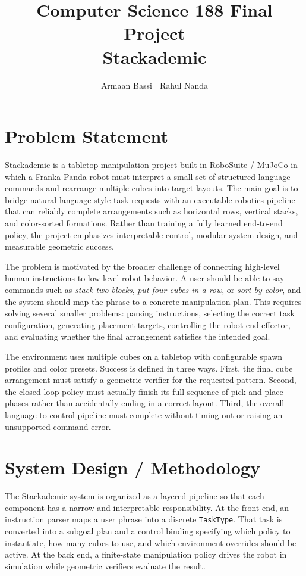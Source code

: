 \documentclass[10pt,letterpaper,twocolumn]{article}
\title{Computer Science 188 Final Project\\[2mm]\large Stackademic}
\author{Armaan Bassi | Rahul Nanda}
\date{}
\begin{document}
\maketitle
\thispagestyle{empty}

\section{Problem Statement}
Stackademic is a tabletop manipulation project built in RoboSuite / MuJoCo in which a Franka Panda robot must interpret a small set of structured language commands and rearrange multiple cubes into target layouts. The main goal is to bridge natural-language style task requests with an executable robotics pipeline that can reliably complete arrangements such as horizontal rows, vertical stacks, and color-sorted formations. Rather than training a fully learned end-to-end policy, the project emphasizes interpretable control, modular system design, and measurable geometric success.

The problem is motivated by the broader challenge of connecting high-level human instructions to low-level robot behavior. A user should be able to say commands such as \textit{stack two blocks}, \textit{put four cubes in a row}, or \textit{sort by color}, and the system should map the phrase to a concrete manipulation plan. This requires solving several smaller problems: parsing instructions, selecting the correct task configuration, generating placement targets, controlling the robot end-effector, and evaluating whether the final arrangement satisfies the intended goal.

The environment uses multiple cubes on a tabletop with configurable spawn profiles and color presets. Success is defined in three ways. First, the final cube arrangement must satisfy a geometric verifier for the requested pattern. Second, the closed-loop policy must actually finish its full sequence of pick-and-place phases rather than accidentally ending in a correct layout. Third, the overall language-to-control pipeline must complete without timing out or raising an unsupported-command error.

\section{System Design / Methodology}
The Stackademic system is organized as a layered pipeline so that each component has a narrow and interpretable responsibility. At the front end, an instruction parser maps a user phrase into a discrete \texttt{TaskType}. That task is converted into a subgoal plan and a control binding specifying which policy to instantiate, how many cubes to use, and which environment overrides should be active. At the back end, a finite-state manipulation policy drives the robot in simulation while geometric verifiers evaluate the result.
\end{document}
